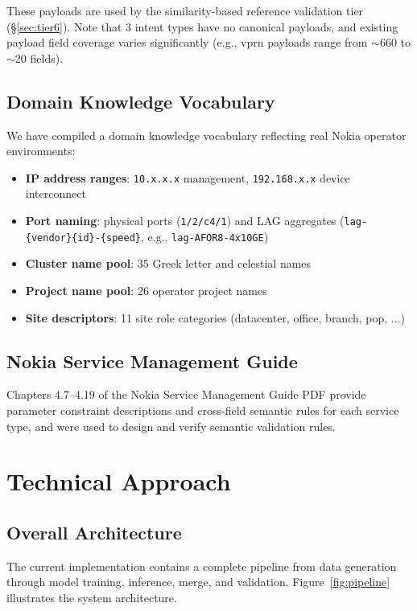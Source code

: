\documentclass[12pt, a4paper]{article}
\begin{document}
\noindent
These payloads are used by the similarity-based reference validation tier (\S\ref{sec:tier6}). Note that 3 intent types have no canonical payloads, and existing payload field coverage varies significantly (e.g., vprn payloads range from $\sim$660 to $\sim$20 fields).

\subsection{Domain Knowledge Vocabulary}

We have compiled a domain knowledge vocabulary reflecting real Nokia operator environments:

\begin{itemize}
  \item \textbf{IP address ranges}: \texttt{10.x.x.x} management, \texttt{192.168.x.x} device interconnect
  \item \textbf{Port naming}: physical ports (\texttt{1/2/c4/1}) and LAG aggregates (\texttt{lag-\{vendor\}\{id\}-\{speed\}}, e.g., \texttt{lag-AFOR8-4x10GE})
  \item \textbf{Cluster name pool}: 35 Greek letter and celestial names
  \item \textbf{Project name pool}: 26 operator project names
  \item \textbf{Site descriptors}: 11 site role categories (datacenter, office, branch, pop, ...)
\end{itemize}

\subsection{Nokia Service Management Guide}

Chapters 4.7--4.19 of the Nokia Service Management Guide PDF provide parameter constraint descriptions and cross-field semantic rules for each service type, and were used to design and verify semantic validation rules.

\section{Technical Approach}
\label{sec:approach}

\subsection{Overall Architecture}

The current implementation contains a complete pipeline from data generation through model training, inference, merge, and validation. Figure~\ref{fig:pipeline} illustrates the system architecture.
\end{document}
